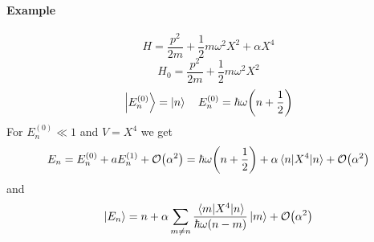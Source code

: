 \paragraph{Example}
$$H = \frac{p^2}{2m} + \frac{1}{2}m\omega^2X^2 + \alpha X^4$$
$$H_0 = \frac{p^2}{2m} + \frac{1}{2}m\omega^2X^2$$
$$\ket{E_n^{(0)}} = \ket{n} \quad E_n^{(0)} = \hbar \omega\qty(n+\frac{1}{2})$$
For $E_n^{(0)} \ll 1$ and $V=X^4$ we get
$$E_n = E_n^{(0)} + aE_n^{(1)} + \order{\alpha^2} = \hbar \omega\qty(n+\frac{1}{2}) + \alpha \mel{n}{X^4}{n} + \order{\alpha^2}$$
and
$$\ket{E_n} = n + \alpha\sum_{m\neq n} \frac{\mel{m}{X^4}{n}}{\hbar \omega\qty(n-m)}\ket{m} + \order{\alpha^2}  $$